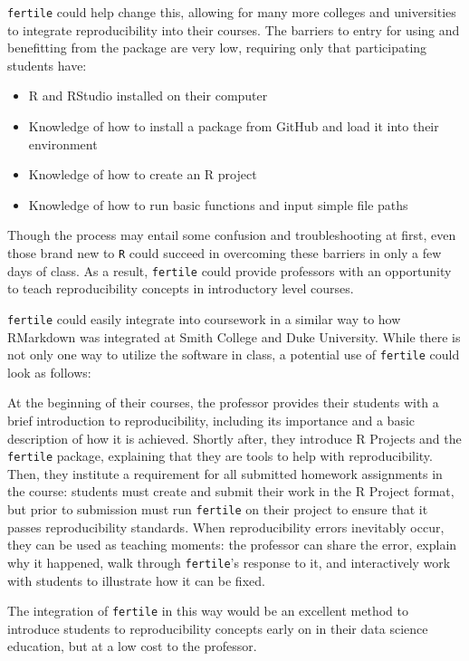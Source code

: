 \documentclass[12pt,twoside]{reedthesis}
\providecommand{\tightlist}{%
  \setlength{\itemsep}{0pt}\setlength{\parskip}{0pt}}
\begin{document}
\texttt{fertile} could help change this, allowing for many more colleges and universities to integrate reproducibility into their courses. The barriers to entry for using and benefitting from the package are very low, requiring only that participating students have:
\begin{itemize}
\tightlist
\item
  R and RStudio installed on their computer
\item
  Knowledge of how to install a package from GitHub and load it into their environment
\item
  Knowledge of how to create an R project
\item
  Knowledge of how to run basic functions and input simple file paths
\end{itemize}
Though the process may entail some confusion and troubleshooting at first, even those brand new to \texttt{R} could succeed in overcoming these barriers in only a few days of class. As a result, \texttt{fertile} could provide professors with an opportunity to teach reproducibility concepts in introductory level courses.

\texttt{fertile} could easily integrate into coursework in a similar way to how RMarkdown was integrated at Smith College and Duke University. While there is not only one way to utilize the software in class, a potential use of \texttt{fertile} could look as follows:

At the beginning of their courses, the professor provides their students with a brief introduction to reproducibility, including its importance and a basic description of how it is achieved. Shortly after, they introduce R Projects and the \texttt{fertile} package, explaining that they are tools to help with reproducibility. Then, they institute a requirement for all submitted homework assignments in the course: students must create and submit their work in the R Project format, but prior to submission must run \texttt{fertile} on their project to ensure that it passes reproducibility standards. When reproducibility errors inevitably occur, they can be used as teaching moments: the professor can share the error, explain why it happened, walk through \texttt{fertile}'s response to it, and interactively work with students to illustrate how it can be fixed.

The integration of \texttt{fertile} in this way would be an excellent method to introduce students to reproducibility concepts early on in their data science education, but at a low cost to the professor.
\end{document}
